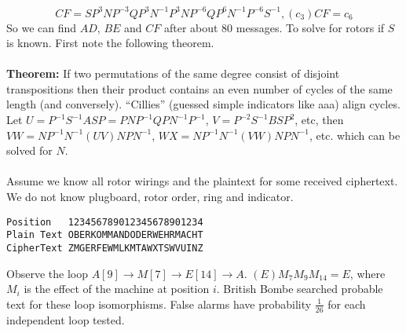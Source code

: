 $$CF= SP^3NP^{-3}QP^3N^{-1}P^3NP^{-6}QP^6N^{-1}P^{-6}S^{-1}, (c_3)CF= c_6$$
So we can find $AD$, $BE$ and $CF$ after about 80 messages.  To solve for rotors if
$S$ is known.  First note the following theorem.
\\
\\
{\bf Theorem: } If two permutations of the same 
degree consist of disjoint transpositions then their product contains an even number of cycles
of the same length (and conversely). ``Cillies'' (guessed simple indicators like aaa)
align cycles. Let $U=P^{-1}S^{-1}ASP= PNP^{-1}QPN^{-1}P^{-1}$,
$V= P^{-2}S^{-1}BSP^2$, etc, then 
$VW= NP^{-1}N^{-1} (UV)  N P N^{-1}$,
$WX= NP^{-1}N^{-1} (VW)  N P N^{-1}$, etc.
which can be solved for $N$.
\\
\\
Assume we know all rotor wirings and the plaintext for some received ciphertext. 
We do not know plugboard, rotor order, ring and indicator.
\begin{verbatim}
Position   123456789012345678901234
Plain Text OBERKOMMANDODERWEHRMACHT
CipherText ZMGERFEWMLKMTAWXTSWVUINZ
\end{verbatim}
Observe the loop $A[9] \rightarrow M[7] \rightarrow E[14] \rightarrow  A$.
$(E)M_7M_9M_{14}=E$, where $M_i$ is the effect of the machine at position $i$.
British Bombe searched probable text for these loop isomorphisms.  False alarms have probability
${\frac 1 {26}}$ for each independent loop tested.
